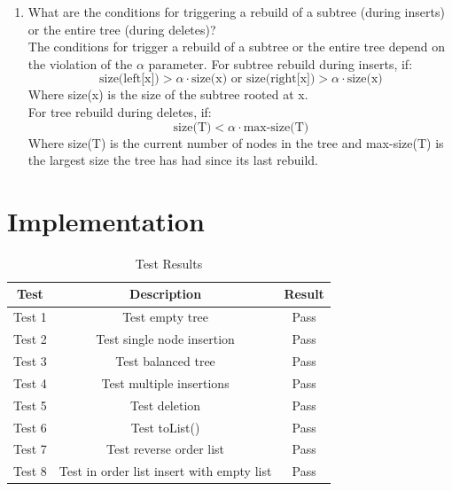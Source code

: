 \documentclass{labReport}
\begin{document}
\begin{enumerate}
    \item What are the conditions for triggering a rebuild of a subtree (during inserts) or the entire tree (during deletes)?\\
    The conditions for trigger a rebuild of a subtree or the entire tree depend on the violation of the $\alpha$ parameter. For subtree rebuild during inserts, if: \\
    \[
    \text{size(left[x])} > \alpha \cdot \text{size(x)} \text{ or } \text{size(right[x])} > \alpha \cdot \text{size(x)}
    \]
    Where size(x) is the size of the subtree rooted at x. \\
    For tree rebuild during deletes, if: \\
    \[
    \text{size(T)} < \alpha \cdot \text{max-size(T)}
    \]
    Where size(T) is the current number of nodes in the tree and max-size(T) is the largest size the tree has had since its last rebuild.

\end{enumerate}

\section{Implementation}


\begin{table}[h!]
    \centering
    \begin{tabular}{|c|c|c|}
    \hline
    Test & Description & Result \\
    \hline
    Test 1 & Test empty tree & Pass \\
    Test 2 & Test single node insertion & Pass \\
    Test 3 & Test balanced tree & Pass \\
    Test 4 & Test multiple insertions & Pass \\
    Test 5 & Test deletion & Pass \\
    Test 6 & Test toList() & Pass \\
    Test 7 & Test reverse order list & Pass \\
    Test 8 & Test in order list insert with empty list & Pass \\
    \hline
    \end{tabular}
    \caption{Test Results}
    \label{table:test_results}
\end{table}
\end{document}
